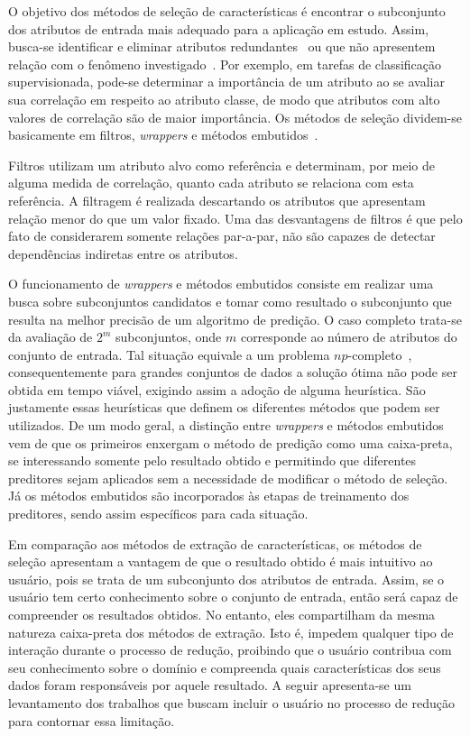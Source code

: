 O objetivo dos métodos de seleção de características é
encontrar o subconjunto  dos atributos de entrada mais
adequado para a aplicação em estudo. Assim, busca-se
identificar e eliminar atributos
redundantes~\cite{Kohavi1997} ou que não apresentem relação
com o fenômeno investigado~\cite{Nilsson2007}.  Por exemplo,
em tarefas de classificação supervisionada, pode-se
determinar a importância de um atributo ao se avaliar sua
correlação em respeito ao atributo classe, de modo que
atributos com alto valores de correlação são de maior
importância. Os métodos de seleção dividem-se basicamente
em filtros, \emph{wrappers} e métodos
embutidos~\cite{Guyon2003}. 

Filtros utilizam um atributo alvo como referência e
determinam, por meio de alguma medida de correlação, quanto
cada atributo se relaciona com esta referência. A filtragem
é realizada descartando os atributos que apresentam relação
menor do que um valor fixado. Uma das desvantagens de
filtros é que pelo fato de considerarem somente relações
par-a-par, não são capazes de detectar dependências
indiretas entre os atributos. 

O funcionamento de \emph{wrappers} e métodos embutidos
consiste em realizar uma busca sobre subconjuntos candidatos
e tomar como resultado o subconjunto que resulta na melhor
precisão de um algoritmo de predição. O caso completo
trata-se da avaliação de $2^m$ subconjuntos, onde $m$
corresponde ao número de atributos do conjunto de entrada.
Tal situação equivale a um problema
$np$-completo~\cite{Amaldi1998}, consequentemente para
grandes conjuntos de dados a solução ótima não pode ser
obtida em tempo viável, exigindo assim a adoção de alguma
heurística. São justamente essas heurísticas que definem os
diferentes métodos que podem ser utilizados. De um modo
geral, a distinção entre \emph{wrappers} e métodos embutidos
vem de que os primeiros enxergam o método de predição como
uma caixa-preta, se interessando somente pelo resultado
obtido e permitindo que diferentes preditores sejam
aplicados sem a necessidade de modificar o método de
seleção. Já os métodos embutidos são incorporados às etapas
de treinamento dos preditores, sendo assim específicos para
cada situação. 

Em comparação aos métodos de extração de características,
os métodos de seleção apresentam a vantagem de que o
resultado obtido é mais intuitivo ao usuário, pois se trata
de um subconjunto dos atributos de entrada. Assim, se o
usuário tem certo conhecimento sobre o conjunto de entrada,
então será capaz de compreender os resultados obtidos. No
entanto, eles compartilham da mesma natureza caixa-preta dos
métodos de extração. Isto é, impedem qualquer tipo de 
interação durante o processo de redução, proibindo que o
usuário contribua com seu conhecimento sobre o domínio e
compreenda quais características dos seus dados foram
responsáveis por aquele resultado. A seguir apresenta-se um
levantamento dos trabalhos que buscam incluir o usuário no
processo de redução para contornar essa limitação.

